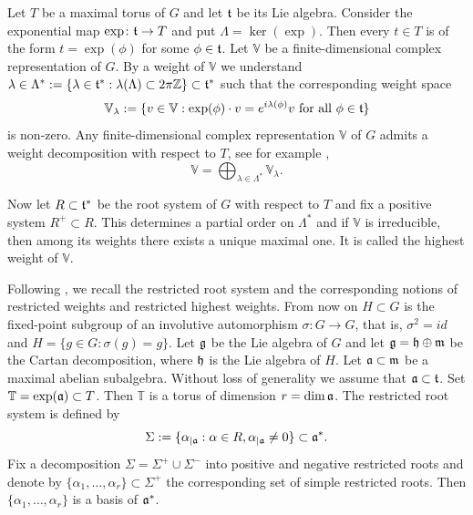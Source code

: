 \documentclass[reqno,twoside,12pt]{amsart}
\newcommand{\bT}{\mathbb{T}}
\newcommand{\bV}{\mathbb{V}}
\newcommand{\bZ}{\mathbb{Z}}
\numberwithin{equation}{section} \errorcontextlines=0
\begin{document}
Let $T$ be a maximal torus of $G$ and let $\frak t$ be its Lie algebra.
Consider the exponential map $\exp\colon\frak t\to T$ and put $\Lambda=\ker(\exp)$.
Then every $t\in T$ is of the form $t=\exp(\phi)$ for some $\phi\in\frak t$.
Let $\bV$ be a finite-dimensional complex representation of $G$. By a weight of $\bV$ we understand $\lambda\in\Lambda^*:=\{\lambda\in\frak t^*:\lambda(\Lambda)\subset2\pi\bZ\}\subset\frak t^*$
such that the corresponding weight space
\[
\bV_\lambda := \{ v \in \bV : \exp(\phi) \cdot v = e^{i \lambda(\phi)} v \text{ for all } \phi\in\frak t\}
\]
is non-zero.
Any finite-dimensional complex representation $\bV$ of $G$ admits a weight decomposition with respect to $T$, see for example \cite{BrockerDieck},
\begin{equation}\label{eq:weight-decomp}
\bV=\bigoplus_{\lambda\in\Lambda^*}\bV_\lambda.
\end{equation}

Now let $R\subset\frak t^*$ be the root system of $G$ with respect to $T$ and fix a positive system $R^+\subset R$. This determines a partial order on $\Lambda^*$ and if $\bV$ is irreducible, then among its weights there exists a unique maximal one. It is called the highest weight of $\bV$.

Following \cite[Subsection~5.7.2]{Gurarie}, we recall the restricted root system and the corresponding notions of restricted weights and restricted highest weights.
From now on $H\subset G$ is the fixed-point subgroup of an involutive automorphism $\sigma\colon G\to G$, that is, $\sigma^2=id$ and $H=\{g\in G:\sigma(g)=g\}$. Let $\frak g$ be the Lie algebra of $G$ and let $\frak g=\frak h\oplus\frak m$ be the Cartan decomposition, where $\frak h$ is the Lie algebra of $H$. Let $\frak a\subset\frak m$ be a maximal abelian subalgebra. Without loss of generality we assume that $\frak a\subset\frak t$. Set $\bT=\exp(\frak a)\subset T$. Then $\bT$ is a torus of dimension $r=\dim\frak a$.
The restricted root system is defined by
\[
\Sigma:=\{\alpha_{|\frak a}:\alpha\in R, \alpha_{|\frak a}\neq0\}\subset\frak a^*.
\]
Fix a decomposition $\Sigma=\Sigma^+\cup\Sigma^-$ into positive and negative restricted roots
and denote by $\{\alpha_1,\dots,\alpha_r\}\subset\Sigma^+$ the corresponding set of simple restricted roots. Then $\{\alpha_1,\dots,\alpha_r\}$ is a basis of $\frak a^*$.
\end{document}
